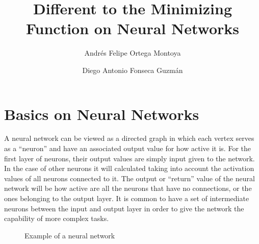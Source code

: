 \documentclass[a4paper, 12pts]{amsart}
\title{Different to the Minimizing Function on Neural Networks}
\author{Andrés Felipe Ortega Montoya \and Diego Antonio Fonseca Guzmán\\
  \monthyeardate{\today}}
\begin{document}
\maketitle
\tableofcontents
\section{Basics on Neural Networks}
A neural network can be viewed as a directed graph in which each vertex serves
as a ``neuron'' and have an associated output value for how active it is.
For the first layer of neurons, their output values are simply input given to
the network. In the case of other neurons it will calculated taking into
account the activation values of all neurons connected to it. The output or
``return'' value of the neural network will be how active are all the neurons
that have no connections, or the ones belonging to the output layer. It is
common to have a set of intermediate neurons between the input and output layer
in order to give the network the capability of more complex tasks.

\begin{figure}[!h]
  \centering
  \def\layersep{2.5cm}

  \caption{Example of a neural network}
\end{figure}
\end{document}
